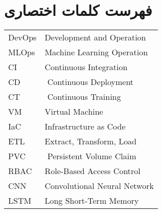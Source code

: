 \chapter*{فهرست کلمات اختصاری}  



\begin{latin}
{
\setlength{\baselineskip}{0.5\baselineskip}
\hfil
\begin{tabular}{p{3cm}l}
DevOps & Development and Operation \\
MLOps  & Machine Learning Operation \\
CI     & Continuous Integration \\
CD     &‌ Continuous Deployment \\
CT     &‌ Continuous Training \\
VM     & Virtual Machine \\
IaC    & Infrastructure as Code \\
ETL‌    & Extract, Transform, Load \\
PVC    &‌ Persistent Volume Claim \\
RBAC   & Role-Based Access Control \\
CNN    & Convolutional  Neural Network \\
LSTM‌   & Long Short-Term Memory \\


\end{tabular}
}
\end{latin}

